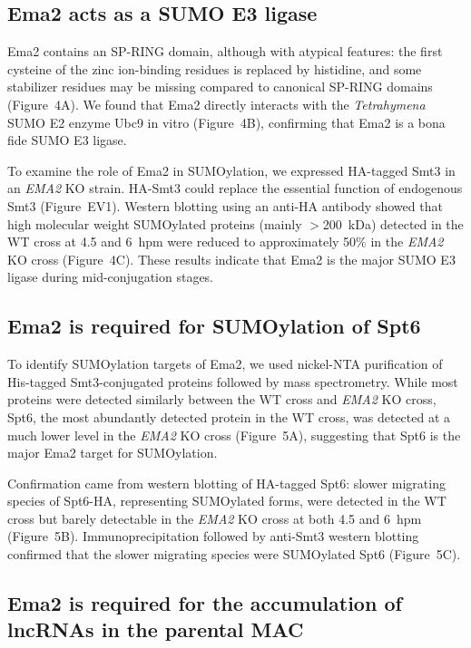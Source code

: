 \documentclass[11pt]{article}
\begin{document}
\subsection{Ema2 acts as a SUMO E3 ligase}

Ema2 contains an SP-RING domain, although with atypical features: the first cysteine of the zinc ion-binding residues is replaced by histidine, and some stabilizer residues may be missing compared to canonical SP-RING domains \citep{duan2009,yunus2009} (Figure~4A). We found that Ema2 directly interacts with the \textit{Tetrahymena} SUMO E2 enzyme Ubc9 in vitro (Figure~4B), confirming that Ema2 is a bona fide SUMO E3 ligase.

To examine the role of Ema2 in SUMOylation, we expressed HA-tagged Smt3 in an \textit{EMA2} KO strain. HA-Smt3 could replace the essential function of endogenous Smt3 (Figure~EV1). Western blotting using an anti-HA antibody showed that high molecular weight SUMOylated proteins (mainly $>$200~kDa) detected in the WT cross at 4.5 and 6~hpm were reduced to approximately 50\% in the \textit{EMA2} KO cross (Figure~4C). These results indicate that Ema2 is the major SUMO E3 ligase during mid-conjugation stages.

\subsection{Ema2 is required for SUMOylation of Spt6}

To identify SUMOylation targets of Ema2, we used nickel-NTA purification of His-tagged Smt3-conjugated proteins followed by mass spectrometry. While most proteins were detected similarly between the WT cross and \textit{EMA2} KO cross, Spt6, the most abundantly detected protein in the WT cross, was detected at a much lower level in the \textit{EMA2} KO cross (Figure~5A), suggesting that Spt6 is the major Ema2 target for SUMOylation.

Confirmation came from western blotting of HA-tagged Spt6: slower migrating species of Spt6-HA, representing SUMOylated forms, were detected in the WT cross but barely detectable in the \textit{EMA2} KO cross at both 4.5 and 6~hpm (Figure~5B). Immunoprecipitation followed by anti-Smt3 western blotting confirmed that the slower migrating species were SUMOylated Spt6 (Figure~5C).

\subsection{Ema2 is required for the accumulation of lncRNAs in the parental MAC}
\end{document}
